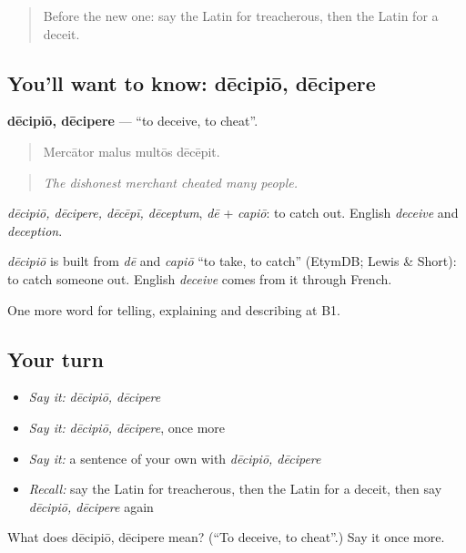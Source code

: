\begin{quote}
Before the new one: say the Latin for treacherous, then the Latin for a deceit.
\end{quote}

\subsection*{You'll want to know: dēcipiō, dēcipere}
\textbf{dēcipiō, dēcipere} — \textquotedblleft{}to deceive, to cheat\textquotedblright{}.

\begin{quote}
Mercātor malus multōs dēcēpit.
\end{quote}

\begin{quote}
\emph{The dishonest merchant cheated many people.}
\end{quote}

\emph{dēcipiō, dēcipere, dēcēpī, dēceptum}, \emph{dē} + \emph{capiō}: to catch out. English \emph{deceive} and \emph{deception}.

\begin{cousinweb}
\emph{dēcipiō} is built from \emph{dē} and \emph{capiō} \textquotedblleft{}to take, to catch\textquotedblright{} (EtymDB; Lewis \& Short): to catch someone out. English \emph{deceive} comes from it through French.
\end{cousinweb}

\begin{grammarlens}[title={What you've built}]
One more word for telling, explaining and describing at B1.
\end{grammarlens}

\subsection*{Your turn}
\begin{itemize}
\raggedright
  \item \emph{Say it:} \emph{dēcipiō, dēcipere}
  \item \emph{Say it:} \emph{dēcipiō, dēcipere}, once more
  \item \emph{Say it:} a sentence of your own with \emph{dēcipiō, dēcipere}
  \item \emph{Recall:} say the Latin for treacherous, then the Latin for a deceit, then say \emph{dēcipiō, dēcipere} again
\end{itemize}

\begin{tcolorbox}[breakable,colback=teal!4,colframe=teal!35!black,title={Before you move on}]
What does dēcipiō, dēcipere mean? (\textquotedblleft{}To deceive, to cheat\textquotedblright{}.) Say it once more.
\end{tcolorbox}
